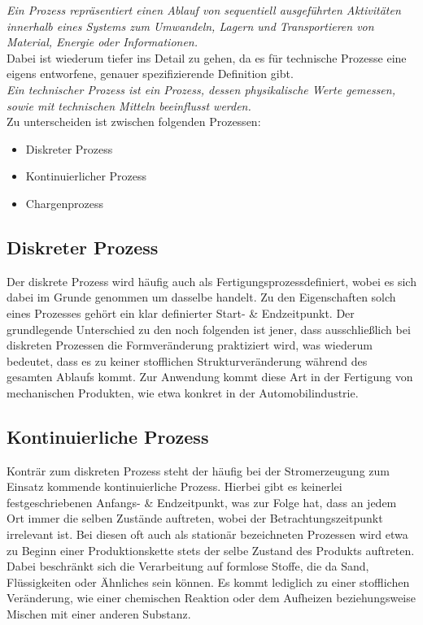 	\textit{Ein Prozess repräsentiert einen Ablauf von sequentiell ausgeführten Aktivitäten innerhalb eines Systems zum Umwandeln, Lagern und Transportieren von Material, Energie oder Informationen.}\\

	Dabei ist wiederum tiefer ins Detail zu gehen, da es für technische Prozesse eine eigens entworfene, genauer spezifizierende Definition gibt.\\
	
	\textit{Ein technischer Prozess ist ein Prozess, dessen physikalische Werte gemessen, sowie mit technischen Mitteln beeinflusst werden.}\\
	
	Zu unterscheiden ist zwischen folgenden Prozessen:
	
	\begin{itemize}
		\item Diskreter Prozess
		\item Kontinuierlicher Prozess
		\item Chargenprozess
	\end{itemize}
	
	\subsection{Diskreter Prozess}
	Der diskrete Prozess wird häufig auch als \glqq Fertigungsprozess\grqq\space definiert, wobei es sich dabei im Grunde genommen um dasselbe handelt. Zu den Eigenschaften solch eines Prozesses gehört ein klar definierter Start- \& Endzeitpunkt. Der grundlegende Unterschied zu den noch folgenden ist jener, dass ausschließlich bei diskreten Prozessen die Formveränderung praktiziert wird, was wiederum bedeutet, dass es zu keiner stofflichen Strukturveränderung während des gesamten Ablaufs kommt. Zur Anwendung kommt diese Art in der Fertigung von mechanischen Produkten, wie etwa konkret in der Automobilindustrie.
	
	\subsection{Kontinuierliche Prozess}
	Konträr zum diskreten Prozess steht der häufig bei der Stromerzeugung zum Einsatz kommende kontinuierliche Prozess. Hierbei gibt es keinerlei festgeschriebenen Anfangs- \& Endzeitpunkt, was zur Folge hat, dass an jedem Ort immer die selben Zustände auftreten, wobei der Betrachtungszeitpunkt irrelevant ist. Bei diesen oft auch als stationär bezeichneten Prozessen wird etwa zu Beginn einer Produktionskette stets der selbe Zustand des Produkts auftreten. Dabei beschränkt sich die Verarbeitung auf formlose Stoffe, die da Sand, Flüssigkeiten oder Ähnliches sein können. Es kommt lediglich zu einer stofflichen Veränderung, wie einer chemischen Reaktion oder dem Aufheizen beziehungsweise Mischen mit einer anderen Substanz.
	
